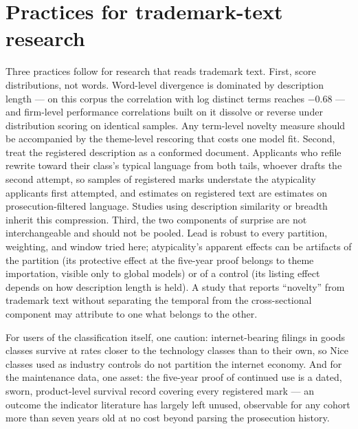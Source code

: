 \section{Practices for trademark-text research}\label{sec:practices}

Three practices follow for research that reads trademark text. First,
score distributions, not words. Word-level divergence is dominated by
description length --- on this corpus the correlation with log distinct
terms reaches $-0.68$ --- and firm-level performance correlations built
on it dissolve or reverse under distribution scoring on identical
samples. Any term-level novelty measure should be accompanied by the
theme-level rescoring that costs one model fit. Second, treat the
registered description as a conformed document. Applicants who refile
rewrite toward their class's typical language from both tails, whoever
drafts the second attempt, so samples of registered marks understate the
atypicality applicants first attempted, and estimates on registered text
are estimates on prosecution-filtered language. Studies using description
similarity or breadth inherit this compression. Third, the two components
of surprise are not interchangeable and should not be pooled. Lead is
robust to every partition, weighting, and window tried here;
atypicality's apparent effects can be artifacts of the partition (its
protective effect at the five-year proof belongs to theme importation,
visible only to global models) or of a control (its listing effect
depends on how description length is held). A study that reports
``novelty'' from trademark text without separating the temporal from the
cross-sectional component may attribute to one what belongs to the other.

For users of the classification itself, one caution: internet-bearing
filings in goods classes survive at rates closer to the technology
classes than to their own, so Nice classes used as industry controls do
not partition the internet economy. And for the maintenance data, one
asset: the five-year proof of continued use is a dated, sworn,
product-level survival record covering every registered mark --- an
outcome the indicator literature has largely left unused, observable for
any cohort more than seven years old at no cost beyond parsing the
prosecution history.
